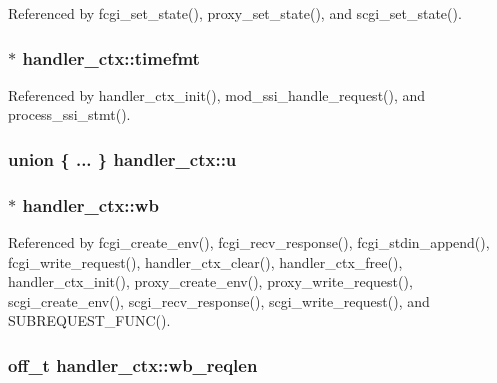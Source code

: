 Referenced by fcgi\-\_\-set\-\_\-state(), proxy\-\_\-set\-\_\-state(), and scgi\-\_\-set\-\_\-state().

\hypertarget{structhandler__ctx_a0dd810f44dd72b1584e2e2fd90dea6f0}{
\subsubsection[{timefmt}]{$\ast$ handler\-\_\-ctx\-::timefmt}}\label{structhandler__ctx_a0dd810f44dd72b1584e2e2fd90dea6f0}


Referenced by handler\-\_\-ctx\-\_\-init(), mod\-\_\-ssi\-\_\-handle\-\_\-request(), and process\-\_\-ssi\-\_\-stmt().

\hypertarget{structhandler__ctx_a131bf09a0cc6196b4dfad94cc76b0507}{
\subsubsection[{u}]{\setlength{\rightskip}{0pt plus 5cm}union \{ ... \}   handler\-\_\-ctx\-::u}}\label{structhandler__ctx_a131bf09a0cc6196b4dfad94cc76b0507}
\hypertarget{structhandler__ctx_a9e6e88621885a181db128efaf713065e}{
\subsubsection[{wb}]{ $\ast$ handler\-\_\-ctx\-::wb}}\label{structhandler__ctx_a9e6e88621885a181db128efaf713065e}


Referenced by fcgi\-\_\-create\-\_\-env(), fcgi\-\_\-recv\-\_\-response(), fcgi\-\_\-stdin\-\_\-append(), fcgi\-\_\-write\-\_\-request(), handler\-\_\-ctx\-\_\-clear(), handler\-\_\-ctx\-\_\-free(), handler\-\_\-ctx\-\_\-init(), proxy\-\_\-create\-\_\-env(), proxy\-\_\-write\-\_\-request(), scgi\-\_\-create\-\_\-env(), scgi\-\_\-recv\-\_\-response(), scgi\-\_\-write\-\_\-request(), and S\-U\-B\-R\-E\-Q\-U\-E\-S\-T\-\_\-\-F\-U\-N\-C().

\hypertarget{structhandler__ctx_a3a2074126d76e92f976772c2a22c663b}{
\subsubsection[{wb\-\_\-reqlen}]{\setlength{\rightskip}{0pt plus 5cm}off\-\_\-t handler\-\_\-ctx\-::wb\-\_\-reqlen}}\label{structhandler__ctx_a3a2074126d76e92f976772c2a22c663b}


